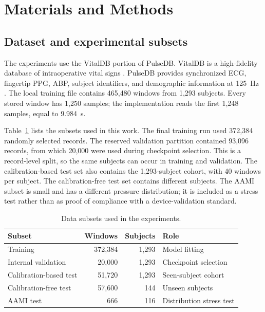 \documentclass[journal,twoside,web]{ieeecolor}
\begin{document}
\section{Materials and Methods}\label{sec:methods}

\subsection{Dataset and experimental subsets}

The experiments use the VitalDB portion of PulseDB. VitalDB is a high-fidelity database of intraoperative vital signs \cite{lee2022vitaldb}. PulseDB provides synchronized ECG, fingertip PPG, ABP, subject identifiers, and demographic information at 125~Hz \cite{wang2023pulsedb}. The local training file contains 465,480 windows from 1,293 subjects. Every stored window has 1,250 samples; the implementation reads the first 1,248 samples, equal to 9.984~s.

Table~\ref{tab:data} lists the subsets used in this work. The final training run used 372,384 randomly selected records. The reserved validation partition contained 93,096 records, from which 20,000 were used during checkpoint selection. This is a record-level split, so the same subjects can occur in training and validation. The calibration-based test set also contains the 1,293-subject cohort, with 40 windows per subject. The calibration-free test set contains different subjects. The AAMI subset is small and has a different pressure distribution; it is included as a stress test rather than as proof of compliance with a device-validation standard.

\begin{table}[!t]
\caption{Data subsets used in the experiments.}
\label{tab:data}
\centering
\begin{tabular}{lrrl}
\toprule
Subset & Windows & Subjects & Role \\
\midrule
Training & 372,384 & 1,293 & Model fitting \\
Internal validation & 20,000 & 1,293 & Checkpoint selection \\
Calibration-based test & 51,720 & 1,293 & Seen-subject cohort \\
Calibration-free test & 57,600 & 144 & Unseen subjects \\
AAMI test & 666 & 116 & Distribution stress test \\
\bottomrule
\end{tabular}
\end{table}
\end{document}
